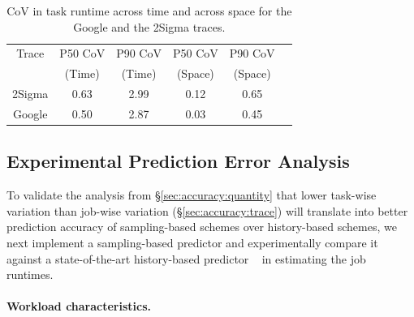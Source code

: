 \begin{table}[tp]
\caption{CoV in task runtime across time and across space for the Google and
	the 2Sigma traces.}
\label{table:accuracy:trace_analysis:covs}
\centering
{\small
\vspace{-0.1in}
\begin{tabular}{|c|c|c|c|c|c|}
\hline
                 Trace       & P50 CoV & P90 CoV & P50 CoV & P90 CoV \\
			& (Time)  & (Time)& (Space) & (Space) \\
\hline
	2Sigma & 0.63 & 2.99 & 0.12 & 0.65 \\
\hline
	Google & 0.50 & 2.87 & 0.03 & 0.45 \\
\hline
\end{tabular}
}
\vspace{-0.1in}
\end{table}

\subsection{Experimental Prediction Error Analysis}
\label{sec:accuracy:experiment}

To validate the analysis from \S\ref{sec:accuracy:quantity} 
that lower task-wise variation than job-wise
variation (\S\ref{sec:accuracy:trace}) will translate into better
prediction accuracy of sampling-based schemes over history-based
schemes, we next implement a sampling-based predictor \slearn and
experimentally compare it against a state-of-the-art history-based
predictor \primarybasepredict~\cite{3Sigma} in estimating the job
runtimes.

\paragraph{Workload characteristics.}

